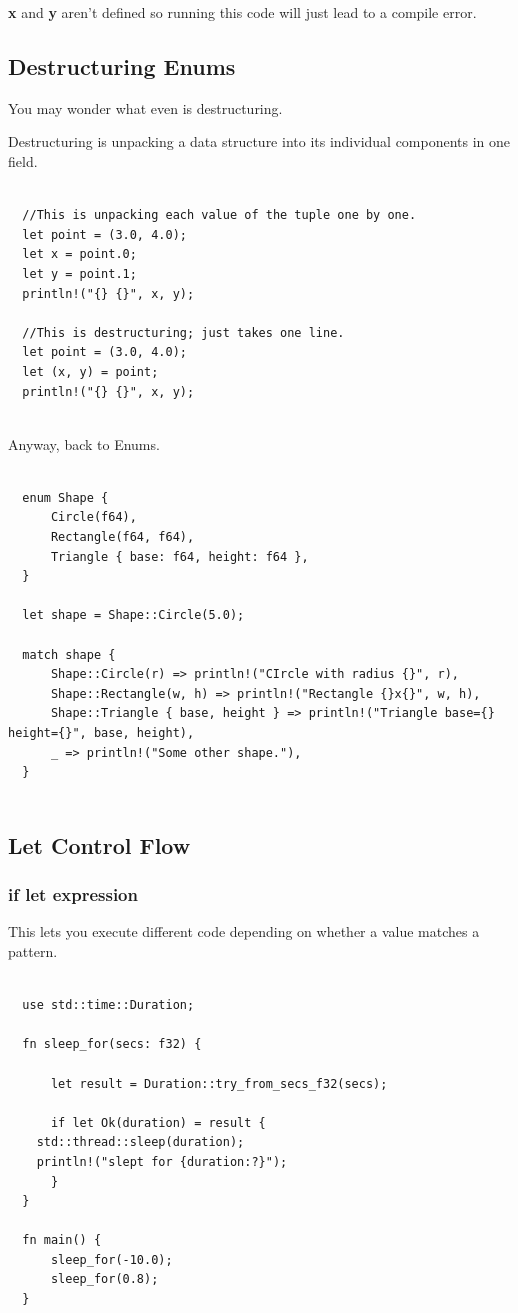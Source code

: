 \documentclass[11pt]{article}
\begin{document}
\textbf{x} and \textbf{y} aren't defined so running this code will just lead to a compile error.
\subsection{Destructuring Enums}
\label{sec:org67b98d9}

You may wonder what even is destructuring.

Destructuring is unpacking a data structure into its individual components in one field.

\begin{verbatim}

  //This is unpacking each value of the tuple one by one.
  let point = (3.0, 4.0);
  let x = point.0;
  let y = point.1;
  println!("{} {}", x, y);

  //This is destructuring; just takes one line.
  let point = (3.0, 4.0);
  let (x, y) = point;
  println!("{} {}", x, y);


\end{verbatim}

Anyway, back to Enums.

\begin{verbatim}

  enum Shape {
      Circle(f64),
      Rectangle(f64, f64),
      Triangle { base: f64, height: f64 },
  }

  let shape = Shape::Circle(5.0);

  match shape {
      Shape::Circle(r) => println!("CIrcle with radius {}", r),
      Shape::Rectangle(w, h) => println!("Rectangle {}x{}", w, h),
      Shape::Triangle { base, height } => println!("Triangle base={} height={}", base, height),
      _ => println!("Some other shape."),
  }


\end{verbatim}
\subsection{Let Control Flow}
\label{sec:org1950251}
\subsubsection{if let expression}
\label{sec:org47adb7f}

This lets you execute different code depending on whether a value matches a pattern.

\begin{verbatim}

  use std::time::Duration;

  fn sleep_for(secs: f32) {

      let result = Duration::try_from_secs_f32(secs);

      if let Ok(duration) = result {
  	std::thread::sleep(duration);
  	println!("slept for {duration:?}");
      }
  }

  fn main() {
      sleep_for(-10.0);
      sleep_for(0.8);
  }


\end{verbatim}
\end{document}
